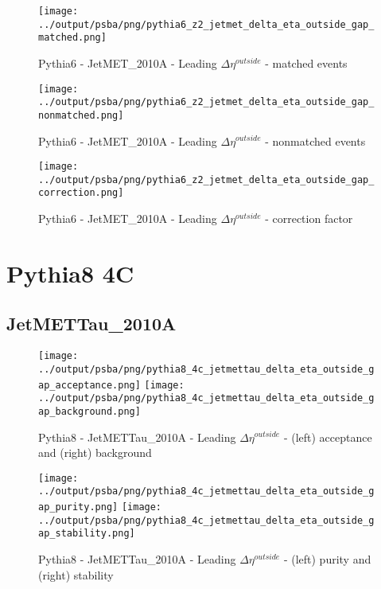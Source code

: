 \documentclass[11pt]{book}
\begin{document}
\begin{figure}[ht]
\centering
\texttt{[image: ../output/psba/png/pythia6\_z2\_jetmet\_delta\_eta\_outside\_gap\_matched.png]}
\caption{Pythia6 - JetMET\_2010A - Leading $\Delta\eta^{outside}$ - matched events}
\label{fig:p6_jetmet_delta_eta_outside_gap_matched}
\end{figure}

\begin{figure}[ht]
\centering
\texttt{[image: ../output/psba/png/pythia6\_z2\_jetmet\_delta\_eta\_outside\_gap\_nonmatched.png]}
\caption{Pythia6 - JetMET\_2010A - Leading $\Delta\eta^{outside}$ - nonmatched events}
\label{fig:p6_jetmet_delta_eta_outside_gap_nonmatched}
\end{figure}

\begin{figure}[ht]
\centering
\texttt{[image: ../output/psba/png/pythia6\_z2\_jetmet\_delta\_eta\_outside\_gap\_correction.png]}
\caption{Pythia6 - JetMET\_2010A - Leading $\Delta\eta^{outside}$ - correction factor}
\label{fig:p6_jetmet_delta_eta_outside_gap_correction}
\end{figure}



\clearpage
\section{Pythia8 4C}
\subsection{JetMETTau\_2010A}

\begin{figure}[ht]
\centering
\texttt{[image: ../output/psba/png/pythia8\_4c\_jetmettau\_delta\_eta\_outside\_gap\_acceptance.png]}
\texttt{[image: ../output/psba/png/pythia8\_4c\_jetmettau\_delta\_eta\_outside\_gap\_background.png]}
\caption{Pythia8 - JetMETTau\_2010A - Leading $\Delta\eta^{outside}$ - (left) acceptance and (right) background}
\label{fig:p8_jetmettau_delta_eta_outside_gap_ab}
\end{figure}

\begin{figure}[ht]
\centering
\texttt{[image: ../output/psba/png/pythia8\_4c\_jetmettau\_delta\_eta\_outside\_gap\_purity.png]}
\texttt{[image: ../output/psba/png/pythia8\_4c\_jetmettau\_delta\_eta\_outside\_gap\_stability.png]}
\caption{Pythia8 - JetMETTau\_2010A - Leading $\Delta\eta^{outside}$ - (left) purity and (right) stability}
\label{fig:p8_jetmettau_delta_eta_outside_gap_ps}
\end{figure}
\end{document}
